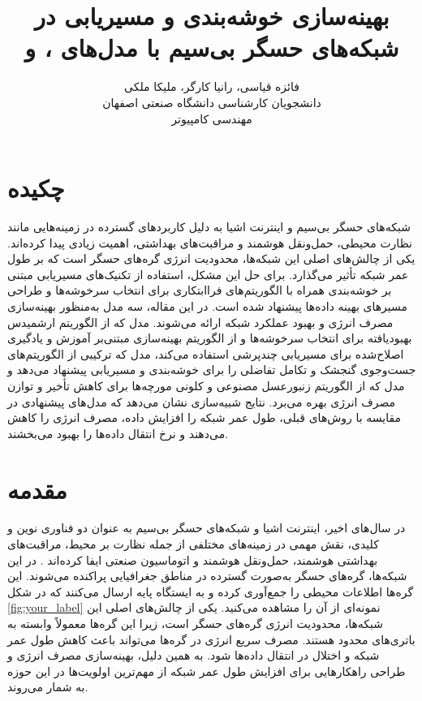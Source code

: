 \documentclass[12pt, onecolumn, a4paper]{article}
\begin{document}
	
	\title{بهینه‌سازی خوشه‌بندی و مسیریابی در شبکه‌های حسگر بی‌سیم با مدل‌های ،  و } 
	\author{فائزه قیاسی، رانیا کارگر، ملیکا ملکی\\
		دانشجویان کارشناسی دانشگاه صنعتی اصفهان\\
		مهندسی کامپیوتر}
	\date{}
	\maketitle
	\thispagestyle{empty}
	\vfill
	
	\section*{چکیده}
	شبکه‌های حسگر بی‌سیم و اینترنت اشیا به دلیل کاربردهای گسترده در زمینه‌هایی مانند نظارت محیطی، حمل‌ونقل هوشمند و مراقبت‌های بهداشتی، اهمیت زیادی پیدا کرده‌اند. یکی از چالش‌های اصلی این شبکه‌ها، محدودیت انرژی گره‌های حسگر است که بر طول عمر شبکه تأثیر می‌گذارد. برای حل این مشکل، استفاده از تکنیک‌های مسیریابی مبتنی بر خوشه‌بندی همراه با الگوریتم‌های فراابتکاری برای انتخاب سرخوشه‌ها و طراحی مسیرهای بهینه داده‌ها پیشنهاد شده است. در این مقاله، سه مدل به‌منظور بهینه‌سازی مصرف انرژی و بهبود عملکرد شبکه ارائه می‌شوند. مدل  که از الگوریتم ارشمیدس بهبودیافته برای انتخاب سرخوشه‌ها و از الگوریتم بهینه‌سازی مبتنی‌بر آموزش و یادگیری اصلاح‌شده برای مسیریابی چندپرشی استفاده می‌کند، مدل  که ترکیبی از الگوریتم‌های جست‌وجوی گنجشک و تکامل تفاضلی را برای خوشه‌بندی و مسیریابی پیشنهاد می‌دهد و مدل  که از الگوریتم زنبورعسل مصنوعی و کلونی مورچه‌ها برای کاهش تأخیر و توازن مصرف انرژی بهره می‌برد. نتایج شبیه‌سازی نشان می‌دهد که مدل‌های پیشنهادی در مقایسه با روش‌های قبلی، طول عمر شبکه را افزایش داده، مصرف انرژی را کاهش می‌دهند و نرخ انتقال داده‌ها را بهبود می‌بخشند. 
	
	\newpage
	
	\section{مقدمه}
	در سال‌های اخیر، اینترنت اشیا و شبکه‌های حسگر بی‌سیم به عنوان دو فناوری نوین و کلیدی، نقش مهمی در زمینه‌های مختلفی از جمله نظارت بر محیط، مراقبت‌های بهداشتی هوشمند، حمل‌ونقل هوشمند و اتوماسیون صنعتی ایفا کرده‌اند \cite{ref1, ref2, ref3}. در این شبکه‌ها، گره‌های حسگر به‌صورت گسترده در مناطق جغرافیایی پراکنده می‌شوند. این گره‌ها اطلاعات محیطی را جمع‌آوری کرده و به ایستگاه پایه ارسال می‌کنند که در شکل \ref{fig:your_label} نمونه‌ای از آن را مشاهده می‌کنید. یکی از چالش‌های اصلی این شبکه‌ها، محدودیت انرژی گره‌های حسگر است، زیرا این گره‌ها معمولاً وابسته به باتری‌های محدود هستند. مصرف سریع انرژی در گره‌ها می‌تواند باعث کاهش طول عمر شبکه و اختلال در انتقال داده‌ها شود. به همین دلیل، بهینه‌سازی مصرف انرژی و طراحی راهکارهایی برای افزایش طول عمر شبکه از مهم‌ترین اولویت‌ها در این حوزه به شمار می‌روند.
	
\end{document}
